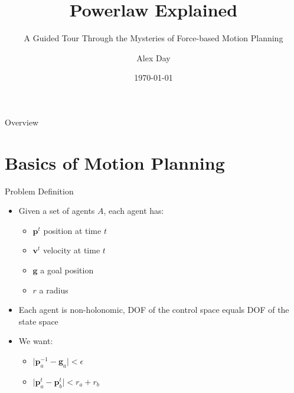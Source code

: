\documentclass[aspectratio=169,xcolor=dvipsnames]{beamer}
\title[short title]{Powerlaw Explained} %
\subtitle{A Guided Tour Through the Mysteries of Force-based Motion Planning}
\author[Day]{Alex Day}
\institute[CU] %
{
  Ph.D. Student\\
  Motion Planning Lab @ Clemson University\\
  \vspace{5px}
}
\date{\today} %
\begin{document}
\begin{frame}
    \titlepage
\end{frame}

\begin{frame}{Overview}
    \tableofcontents
\end{frame}

\section{Basics of Motion Planning}

\begin{frame}{Problem Definition}
    \begin{itemize}
        \item Given a set of agents $A$, each agent has:
        \begin{itemize}
          \item $\mathbf{p}^{t}$ position at time $t$
          \item $\mathbf{v}^{t}$ velocity at time $t$
          \item $\mathbf{g}$ a goal position
          \item $r$ a radius
        \end{itemize}
        \item Each agent is non-holonomic, DOF of the control space equals DOF of the state space
        \item We want:
        \begin{itemize}
          \item $\lvert \mathbf{p}^{-1}_{a} - \mathbf{g}_{a} \rvert < \epsilon$
          \item $\lvert \mathbf{p}^{t}_{a} - \mathbf{p}^{t}_{b} \rvert < r_{a} + r_{b}$
        \end{itemize}
    \end{itemize}
\end{frame}
\end{document}
